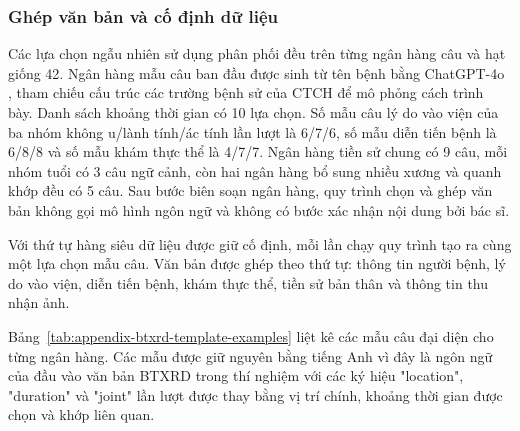 \subsubsection{Ghép văn bản và cố định dữ liệu}

Các lựa chọn ngẫu nhiên sử dụng phân phối đều trên từng ngân hàng câu và hạt giống 42. Ngân hàng mẫu câu ban đầu được sinh từ tên bệnh bằng ChatGPT-4o \cite{OpenAI2024GPT4oSystemCard}, tham chiếu cấu trúc các trường bệnh sử của CTCH để mô phỏng cách trình bày. Danh sách khoảng thời gian có 10 lựa chọn. Số mẫu câu lý do vào viện của ba nhóm không u/lành tính/ác tính lần lượt là 6/7/6, số mẫu diễn tiến bệnh là 6/8/8 và số mẫu khám thực thể là 4/7/7. Ngân hàng tiền sử chung có 9 câu, mỗi nhóm tuổi có 3 câu ngữ cảnh, còn hai ngân hàng bổ sung nhiều xương và quanh khớp đều có 5 câu. Sau bước biên soạn ngân hàng, quy trình chọn và ghép văn bản không gọi mô hình ngôn ngữ và không có bước xác nhận nội dung bởi bác sĩ.

Với thứ tự hàng siêu dữ liệu được giữ cố định, mỗi lần chạy quy trình tạo ra cùng một lựa chọn mẫu câu. Văn bản được ghép theo thứ tự: thông tin người bệnh, lý do vào viện, diễn tiến bệnh, khám thực thể, tiền sử bản thân và thông tin thu nhận ảnh.

Bảng~\ref{tab:appendix-btxrd-template-examples} liệt kê các mẫu câu đại diện cho từng ngân hàng. Các mẫu được giữ nguyên bằng tiếng Anh vì đây là ngôn ngữ của đầu vào văn bản BTXRD trong thí nghiệm với các ký hiệu "location", "duration" và "joint" lần lượt được thay bằng vị trí chính, khoảng thời gian được chọn và khớp liên quan.


